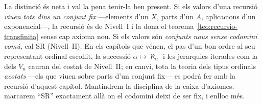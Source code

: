 \begin{observacio}\label{obs:frontera-balanc}
La distinció és neta i val la pena tenir-la ben present. Si els valors d'una
recursió \emph{viuen tots dins un conjunt fix} ---elements d'un \(X\), parts
d'un \(A\), aplicacions d'un exponencial---, la recursió és de Nivell~I i la
dona el teorema~\ref{teo:recursio-transfinita} sense cap axioma nou. Si els
valors són \emph{conjunts nous sense codomini comú}, cal SR (Nivell~II). En
els capítols que vénen, el pas d'un bon ordre al seu representant ordinal
escollit, la successió \(\alpha\mapsto\aleph_\alpha\) i les jerarquies
iterades com la dels \(V_n\) cauran del costat de Nivell~II; en canvi, tota la
teoria dels tipus ordinals \emph{acotats} ---els que viuen sobre parts d'un
conjunt fix--- es podrà fer amb la recursió d'aquest capítol. Mantindrem la
disciplina de la caixa d'axiomes: marcarem \enquote{SR} exactament allà on el
codomini deixi de ser fix, i enlloc més.
\end{observacio}

